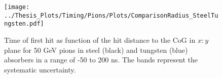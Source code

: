 \begin{figure}[htbp!]
	\centering
	\texttt{[image: ../Thesis\_Plots/Timing/Pions/Plots/ComparisonRadius\_SteelTungsten.pdf]}
	\caption{Time of first hit as function of the hit distance to the CoG in $x:y$ plane for 50 GeV pions in steel (black) and tungsten (blue) absorbers in a range of -50 to 200 ns. The bands represent the systematic uncertainty.}
	\label{fig:Radius_ComparisonST}
\end{figure}
